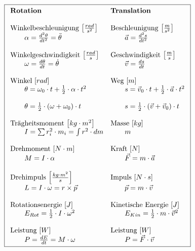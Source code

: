 \[ \boxed{\begin{array}{l l}
\textbf{Rotation} & \textbf{Translation} \\
& \\
\text{Winkelbeschleunigung $\left[\frac{rad}{s^2}\right]$}
	& \text{Beschleunigung $\left[\frac{m}{s^2}\right]$} \\
		\qquad \alpha = \frac{d^2\theta}{dt^2} = \ddot{\theta}
			& \qquad \vec{a} = \frac{d^2s}{dt^2} \\
& \\
\text{Winkelgeschwindigkeit $\left[\frac{rad}{s}\right]$} 
	& \text{Geschwindigkeit $\left[\frac{m}{s}\right]$} \\
		\qquad \omega = \frac{d\theta}{dt} = \dot{\theta} 
			& \qquad \vec{v} = \frac{ds}{dt} \\
& \\
\text{Winkel $\left[rad\right]$} 
	& \text{Weg $\left[ m \right]$} \\
		\qquad \theta = \omega_0 \cdot t + \frac{1}{2} \cdot \alpha \cdot t^2
			& \qquad s = \vec{v}_0 \cdot t + \frac{1}{2} \cdot \vec{a} \cdot t^2 \\
		& \\
		\qquad \theta = \frac{1}{2} \cdot (\omega + \omega_0) \cdot t
			& \qquad s = \frac{1}{2} \cdot (\vec{v} + \vec{v}_0) \cdot t \\
& \\
\text{Trägheitsmoment $\left[kg \cdot m^2\right]$} 
	& \text{Masse $\left[kg\right]$} \\
		\qquad I = \sum r_i^2 \cdot m_i = \int r^2 \cdot dm
			& \qquad m \\
& \\
\text{Drehmoment $\left[N \cdot m\right]$}
	& \text{Kraft $\left[N\right]$} \\
		\qquad M = I \cdot \alpha
			& \qquad \vec{F} = m \cdot \vec{a} \\
& \\
\text{Drehimpuls $\left[\frac{kg \cdot m^2}{s}\right]$} 
	& \text{Impuls $\left[N \cdot s\right]$} \\
		\qquad L = I \cdot \omega 
			= r \times \vec{p}
			& \qquad \vec{p} = m \cdot \vec{v} \\
& \\
\text{Rotationsenergie $\left[J\right]$} 
	& \text{Kinetische Energie $\left[J\right]$} \\
		\qquad E_{Rot} = \frac{1}{2} \cdot I \cdot \omega^2
			& \qquad E_{Kin} = \frac{1}{2} \cdot m \cdot \vec{v}^2 \\
& \\
\text{Leistung $\left[W\right]$}
	& \text{Leistung $\left[W\right]$} \\
		\qquad P = \frac{dE}{dt} = M \cdot \omega 
			& \qquad P = \vec{F} \cdot \vec{v}
\end{array} } \]


